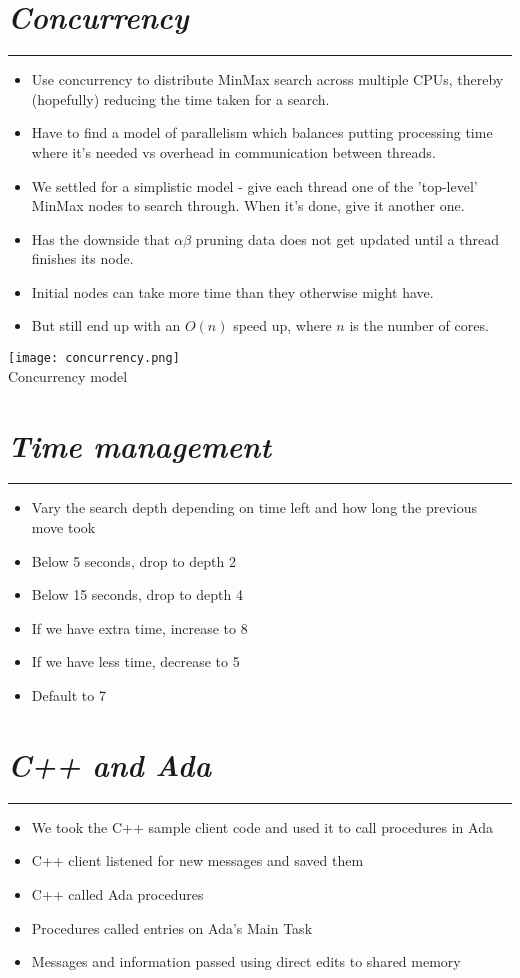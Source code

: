 \documentclass[10pt]{report}
\begin{document}
\section*{\emph{Concurrency}}
\hrule
    \begin{itemize}
  \item
	Use concurrency to distribute MinMax search across multiple CPUs, thereby (hopefully) reducing the time taken for a search.
 \item
	Have to find a model of parallelism which balances putting processing time where it's needed vs overhead in communication between threads.
 \item
	We settled for a simplistic model - give each thread one of the 'top-level' MinMax nodes to search through. When it's done, give it another one.
 \item
	Has the downside that $\alpha \beta$ pruning data does not get updated until a thread finishes its node.
 \item
	Initial nodes can take more time than they otherwise might have.
 \item
	But still end up with an $O(n)$ speed up, where $n$ is the number of cores.
  \end{itemize}

\begin{center}
\texttt{[image: concurrency.png]}
\\Concurrency model
\end{center}

\section*{\emph{Time management}}
\hrule
    \begin{itemize}
  \item
    Vary the search depth depending on time left and how long the previous move took
  \item
     Below 5 seconds, drop to depth 2  
  \item
    Below 15 seconds, drop to depth 4
  \item
    If we have extra time, increase to 8
  \item
    If we have less time, decrease to 5
  \item
    Default to 7
  \end{itemize}

\section*{\emph{C++ and Ada}}
\hrule
    \begin{itemize}
  \item
    We took the C++ sample client code and used it to call procedures in Ada
  \item
    C++ client listened for new messages and saved them
  \item
   C++ called Ada procedures
  \item
   Procedures called entries on Ada's Main Task
  \item
   Messages and information passed using direct edits to shared memory
  \end{itemize}
\end{document}
